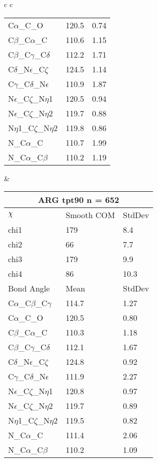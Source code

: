 \begin{longtable}{ c c }
\begin{tabular}{ l l l }
  C$\alpha$\_C\_O & 120.5 & 0.74\\
  C$\beta$\_C$\alpha$\_C & 110.6 & 1.15\\
  C$\beta$\_C$\gamma$\_C$\delta$ & 112.2 & 1.71\\
  C$\delta$\_N$\epsilon$\_C$\zeta$ & 124.5 & 1.14\\
  C$\gamma$\_C$\delta$\_N$\epsilon$ & 110.9 & 1.87\\
  N$\epsilon$\_C$\zeta$\_N$\eta$1 & 120.5 & 0.94\\
  N$\epsilon$\_C$\zeta$\_N$\eta$2 & 119.7 & 0.88\\
  N$\eta$1\_C$\zeta$\_N$\eta$2 & 119.8 & 0.86\\
  N\_C$\alpha$\_C & 110.7 & 1.99\\
  N\_C$\alpha$\_C$\beta$ & 110.2 & 1.19\\
  \bottomrule
  \end{tabular}
  &
  \begin{tabular}{ l l l }
  \toprule
  \multicolumn{3}{c}{ARG \textbf{tpt90} n = 652} \\ \toprule
  $\chi$       & Smooth COM & StdDev \\ \midrule
  chi1 & 179 & 8.4 \\ 
  chi2 & 66 & 7.7 \\ 
  chi3 & 179 & 9.9 \\ 
  chi4 & 86 & 10.3 \\ \midrule
  Bond Angle   & Mean     & StdDev \\ \midrule
  C$\alpha$\_C$\beta$\_C$\gamma$ & 114.7 & 1.27\\
  C$\alpha$\_C\_O & 120.5 & 0.80\\
  C$\beta$\_C$\alpha$\_C & 110.3 & 1.18\\
  C$\beta$\_C$\gamma$\_C$\delta$ & 112.1 & 1.67\\
  C$\delta$\_N$\epsilon$\_C$\zeta$ & 124.8 & 0.92\\
  C$\gamma$\_C$\delta$\_N$\epsilon$ & 111.9 & 2.27\\
  N$\epsilon$\_C$\zeta$\_N$\eta$1 & 120.8 & 0.97\\
  N$\epsilon$\_C$\zeta$\_N$\eta$2 & 119.7 & 0.89\\
  N$\eta$1\_C$\zeta$\_N$\eta$2 & 119.5 & 0.82\\
  N\_C$\alpha$\_C & 111.4 & 2.06\\
  N\_C$\alpha$\_C$\beta$ & 110.2 & 1.09\\
  \bottomrule
  \end{tabular}
  \\

\end{longtable}
